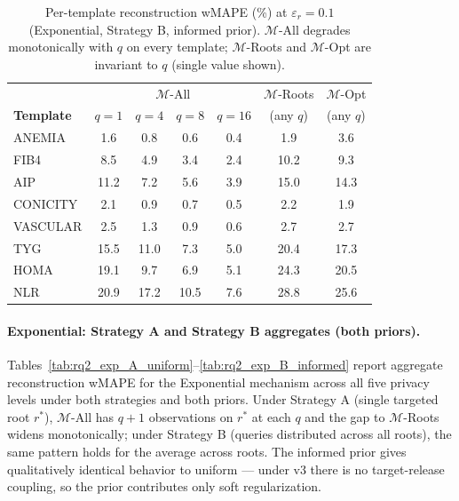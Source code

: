 \begin{table}[h]
\centering
\setlength{\tabcolsep}{3pt}
\small
\caption{Per-template reconstruction wMAPE (\%) at $\varepsilon_r = 0.1$ (Exponential, Strategy B, informed prior). $\mathcal{M}$-All degrades monotonically with $q$ on every template; $\mathcal{M}$-Roots and $\mathcal{M}$-Opt are invariant to $q$ (single value shown).}
\label{tab:rq2_per_template}
\begin{tabular}{l|cccc|cc}
\toprule
& \multicolumn{4}{c|}{$\mathcal{M}$-All} & $\mathcal{M}$-Roots & $\mathcal{M}$-Opt \\
\textbf{Template} & $q{=}1$ & $q{=}4$ & $q{=}8$ & $q{=}16$ & (any $q$) & (any $q$) \\
\midrule
ANEMIA   & 1.6  & 0.8  & 0.6  & 0.4  & 1.9  & 3.6 \\
FIB4     & 8.5  & 4.9  & 3.4  & 2.4  & 10.2 & 9.3 \\
AIP      & 11.2 & 7.2  & 5.6  & 3.9  & 15.0 & 14.3 \\
CONICITY & 2.1  & 0.9  & 0.7  & 0.5  & 2.2  & 1.9 \\
VASCULAR & 2.5  & 1.3  & 0.9  & 0.6  & 2.7  & 2.7 \\
TYG      & 15.5 & 11.0 & 7.3  & 5.0  & 20.4 & 17.3 \\
HOMA     & 19.1 & 9.7  & 6.9  & 5.1  & 24.3 & 20.5 \\
NLR      & 20.9 & 17.2 & 10.5 & 7.6  & 28.8 & 25.6 \\
\bottomrule
\end{tabular}
\end{table}

\paragraph{Exponential: Strategy A and Strategy B aggregates (both priors).}
Tables~\ref{tab:rq2_exp_A_uniform}--\ref{tab:rq2_exp_B_informed} report aggregate reconstruction wMAPE for the Exponential mechanism across all five privacy levels under both strategies and both priors. Under Strategy A (single targeted root $r^*$), $\mathcal{M}$-All has $q+1$ observations on $r^*$ at each $q$ and the gap to $\mathcal{M}$-Roots widens monotonically; under Strategy B (queries distributed across all roots), the same pattern holds for the average across roots. The informed prior gives qualitatively identical behavior to uniform — under v3 there is no target-release coupling, so the prior contributes only soft regularization.


